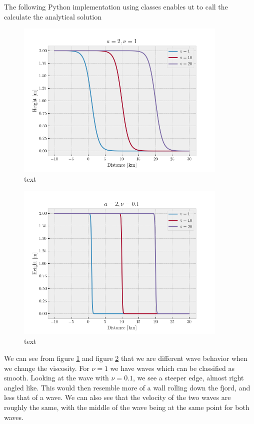 \documentclass[10pt, a4paper]{amsart}
\begin{document}
The following Python implementation using classes enables ut to call the calculate the analytical solution 

\begin{figure}
	\centering
	\includegraphics[width=0.9\textwidth]{../code/1a1.png}
	\caption{text}
	\label{key1}
\end{figure}
\begin{figure}
	\centering
	\includegraphics[width=0.9\textwidth]{../code/1a2.png}
	\caption{text}
	\label{key2}
\end{figure}
We can see from figure \ref{key1} and figure \ref{key2} that we are different wave behavior when we change the viscosity. For $\nu = 1$ we have waves which can be classified as smooth. 
Looking at the wave with $\nu = 0.1$, we see a steeper edge, almost right angled like. This would then resemble more of a wall rolling down the fjord, and less that of a wave. We can also see that the velocity of the two waves are roughly the same, with the middle of the wave being at the same point for both waves. 
\end{document}
